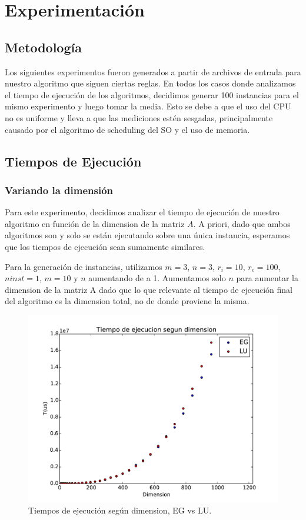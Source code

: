 \section{Experimentación}

\subsection{Metodología}

Los siguientes experimentos fueron generados a partir de archivos de entrada para nuestro algoritmo que siguen ciertas reglas. En todos los casos donde analizamos el tiempo de ejecución de los algoritmos, decidimos generar 100 instancias para el mismo experimento y luego tomar la media. Esto se debe a que el uso del CPU no es uniforme y lleva a que las mediciones estén sesgadas, principalmente causado por el algoritmo de scheduling del SO y el uso de memoria.

\subsection{Tiempos de Ejecución}

\subsubsection{Variando la dimensión}

Para este experimento, decidimos analizar el tiempo de ejecución de nuestro algoritmo en función de la dimension de la matriz $A$. A priori, dado que ambos algoritmos son  y solo se están ejecutando sobre una única instancia, esperamos que los tiempos de ejecución sean sumamente similares.

Para la generación de instancias, utilizamos $m = 3$, $n = 3$, $r_i = 10$, $r_e = 100$, $ninst = 1$, $m = 10$ y $n$ aumentando de a 1. Aumentamos solo $n$ para aumentar la dimension de la matriz A dado que lo que relevante al tiempo de ejecución final del algoritmo es la dimension total, no de donde proviene la misma.

\begin{figure}[h]
\centering
\includegraphics[scale=0.7]{graficos/dimVariable.pdf}
\caption{Tiempos de ejecución según dimension, EG vs LU.}
\end{figure}

